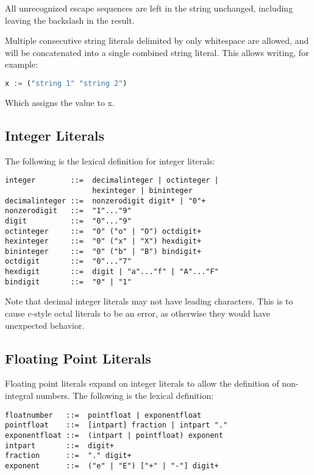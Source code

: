 All unrecognized escape sequences are left in the string unchanged, including
leaving the backslash in the result.

Multiple consecutive string literals delimited by only whitespace are allowed,
and will be concatenated into a single combined string literal. This allows
writing, for example:

\begin{lstlisting}[language=Python]
x := ("string 1" "string 2")
\end{lstlisting}

Which assigns the value  to x.

\subsection{Integer Literals}

The following is the lexical definition for integer literals:

\begin{lstlisting}
integer        ::=  decimalinteger | octinteger |
                    hexinteger | bininteger
decimalinteger ::=  nonzerodigit digit* | "0"+
nonzerodigit   ::=  "1"..."9"
digit          ::=  "0"..."9"
octinteger     ::=  "0" ("o" | "O") octdigit+
hexinteger     ::=  "0" ("x" | "X") hexdigit+
bininteger     ::=  "0" ("b" | "B") bindigit+
octdigit       ::=  "0"..."7"
hexdigit       ::=  digit | "a"..."f" | "A"..."F"
bindigit       ::=  "0" | "1"
\end{lstlisting}

Note that decimal integer literals may not have leading  characters.
This is to cause c-style octal literals to be an error, as otherwise they would
have unexpected behavior.

\subsection{Floating Point Literals}

Floating point literals expand on integer literals to allow the definition of
non-integral numbers. The following is the lexical definition:

\begin{lstlisting}
floatnumber   ::=  pointfloat | exponentfloat
pointfloat    ::=  [intpart] fraction | intpart "."
exponentfloat ::=  (intpart | pointfloat) exponent
intpart       ::=  digit+
fraction      ::=  "." digit+
exponent      ::=  ("e" | "E") ["+" | "-"] digit+
\end{lstlisting}

